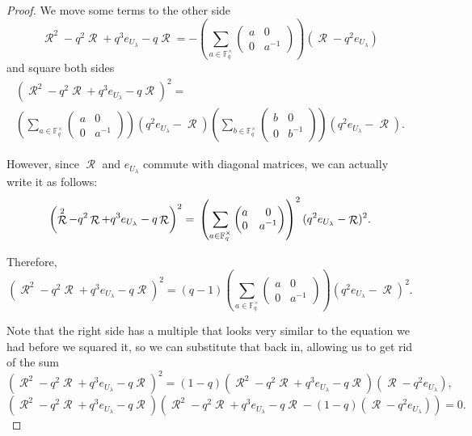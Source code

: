 \documentclass[12pt,reqno]{amsart}
\theoremstyle{definition}
\theoremstyle{remark}
\numberwithin{equation}{section}
\DeclareMathOperator{\R}{\mathcal{R}}
\begin{document}
\begin{proof}
We move some terms to the other side
\begin{equation*}
    \R^2 -  q^2 \R + q^3 e_{U_{\lambda}} - q \R  = -\left(  \sum_{a \in \mathbb{F}_q^\times} \begin{pmatrix}
    a & 0 \\
    0 & a^{-1}
    \end{pmatrix} \right) ( \R - q^2 e_{U_{\lambda}})
\end{equation*}
and square both sides
\begin{multline*}
    \left(\R^2 -  q^2 \R + q^3 e_{U_{\lambda}} - q \R\right)^2 =\\
    \left(  \sum_{a \in \mathbb{F}_q^\times} \begin{pmatrix}
    a & 0 \\
    0 & a^{-1}
    \end{pmatrix} \right) (q^2 e_{U_{\lambda}} - \R) \left(  \sum_{b \in \mathbb{F}_q^\times} \begin{pmatrix}
    b & 0 \\
    0 & b^{-1}
    \end{pmatrix} \right) ( q^2 e_{U_{\lambda}} - \R).
\end{multline*}

However, since $\R$ and $e_{U_{\lambda}}$ commute with diagonal matrices, we can actually write it as follows:
\begin{equation*}
    \left(\R^2 -  q^2 \R + q^3 e_{U_{\lambda}} - q \R\right)^2 =\\
    \left(  \sum_{a \in \mathbb{F}_q^\times} \begin{pmatrix}
    a & 0 \\
    0 & a^{-1}
    \end{pmatrix} \right)^2 ( q^2 e_{U_{\lambda}} - \R)^2.
\end{equation*}

Therefore,
\begin{equation*}
    \left(\R^2 -  q^2 \R + q^3 e_{U_{\lambda}} - q \R\right)^2 =
    (q-1) \left(  \sum_{a \in \mathbb{F}_q^\times} \begin{pmatrix}
    a & 0 \\
    0 & a^{-1}
    \end{pmatrix} \right) ( q^2 e_{U_{\lambda}} - \R)^2.
\end{equation*}

Note that the right side has a multiple that looks very similar to the equation we had before we squared it, so we can substitute that back in, allowing us to get rid of the sum
\begin{equation*}
    \left(\R^2 -  q^2 \R + q^3 e_{U_{\lambda}} - q \R\right)^2 =
    (1-q) \left(\R^2 -  q^2 \R + q^3 e_{U_{\lambda}} - q \R\right) ( \R - q^2e_{U_{\lambda}} ),
\end{equation*}
\begin{equation*}
    \left(\R^2 -  q^2 \R + q^3 e_{U_{\lambda}} - q \R\right)
    \left(\R^2 -  q^2 \R + q^3 e_{U_{\lambda}} - q \R-(1-q)(\R - q^2e_{U_{\lambda}})\right) = 0.
\end{equation*}


\end{proof}
\end{document}
